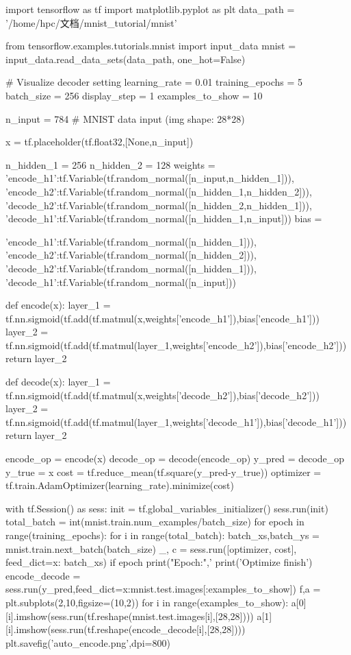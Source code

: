\begin{python}
import tensorflow as tf
import matplotlib.pyplot as plt
data_path = '/home/hpc/文档/mnist_tutorial/mnist'

from tensorflow.examples.tutorials.mnist import input_data
mnist = input_data.read_data_sets(data_path, one_hot=False)


# Visualize decoder setting
learning_rate = 0.01
training_epochs = 5
batch_size = 256
display_step = 1
examples_to_show = 10

n_input = 784  # MNIST data input (img shape: 28*28)

x = tf.placeholder(tf.float32,[None,n_input])

n_hidden_1 = 256
n_hidden_2 = 128
weights = {
    'encode_h1':tf.Variable(tf.random_normal([n_input,n_hidden_1])),
    'encode_h2':tf.Variable(tf.random_normal([n_hidden_1,n_hidden_2])),
    'decode_h2':tf.Variable(tf.random_normal([n_hidden_2,n_hidden_1])),
    'decode_h1':tf.Variable(tf.random_normal([n_hidden_1,n_input]))
}
bias = {'encode_h1':tf.Variable(tf.random_normal([n_hidden_1])),
    'encode_h2':tf.Variable(tf.random_normal([n_hidden_2])),
    'decode_h2':tf.Variable(tf.random_normal([n_hidden_1])),
    'decode_h1':tf.Variable(tf.random_normal([n_input]))

}
def encode(x):
    layer_1 = tf.nn.sigmoid(tf.add(tf.matmul(x,weights['encode_h1']),bias['encode_h1']))
    layer_2 = tf.nn.sigmoid(tf.add(tf.matmul(layer_1,weights['encode_h2']),bias['encode_h2']))
    return layer_2

def decode(x):
    layer_1 = tf.nn.sigmoid(tf.add(tf.matmul(x,weights['decode_h2']),bias['decode_h2']))
    layer_2 = tf.nn.sigmoid(tf.add(tf.matmul(layer_1,weights['decode_h1']),bias['decode_h1']))
    return layer_2



encode_op = encode(x)
decode_op = decode(encode_op)
y_pred = decode_op
y_true = x
cost = tf.reduce_mean(tf.square(y_pred-y_true))
optimizer = tf.train.AdamOptimizer(learning_rate).minimize(cost)

with tf.Session() as sess:
    init = tf.global_variables_initializer()
    sess.run(init)
    total_batch = int(mnist.train.num_examples/batch_size)
    for epoch in range(training_epochs):
        for i in range(total_batch):
            batch_xs,batch_ys = mnist.train.next_batch(batch_size)
            _, c = sess.run([optimizer, cost], feed_dict={x: batch_xs})
        if epoch%
            print("Epoch:",'%
    print('Optimize finish')
    encode_decode = sess.run(y_pred,feed_dict={x:mnist.test.images[:examples_to_show]})
    f,a = plt.subplots(2,10,figsize=(10,2))
    for i in range(examples_to_show):
        a[0][i].imshow(sess.run(tf.reshape(mnist.test.images[i],[28,28])))
        a[1][i].imshow(sess.run(tf.reshape(encode_decode[i],[28,28])))
    plt.savefig('auto_encode.png',dpi=800)
\end{python}
